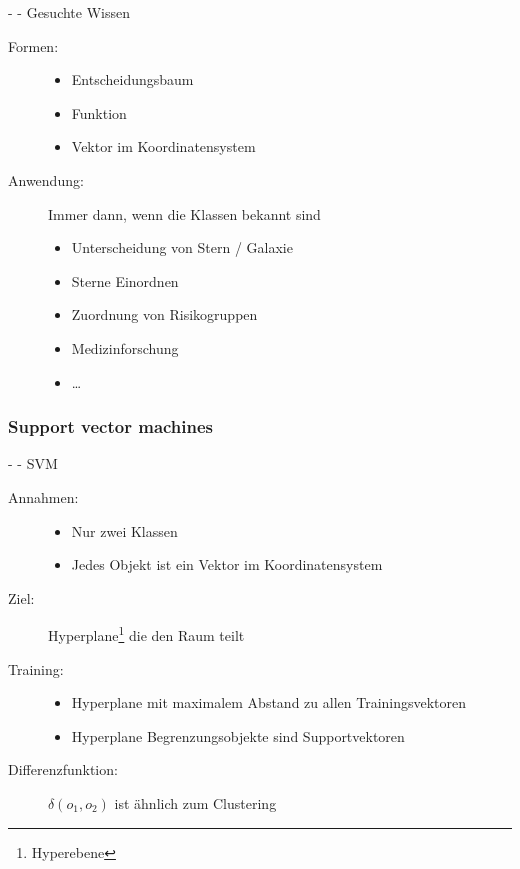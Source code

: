 \documentclass[fleqn,11pt,aspectratio=43]{beamer}
\begin{document}
\begin{frame}{\insertsectionhead - \insertsubsectionhead - Gesuchte Wissen \cite{ester2000knowledge}}
\begin{description}
\item[Formen:]
\begin{itemize}
\item Entscheidungsbaum %
\item Funktion %
\item Vektor im Koordinatensystem
\end{itemize}
\item[Anwendung:] Immer dann, wenn die Klassen bekannt sind
\begin{itemize}
\item Unterscheidung von Stern / Galaxie
\item Sterne Einordnen
\item Zuordnung von Risikogruppen
\item Medizinforschung
\item \dots
\end{itemize}
\end{description}
\end{frame}

\subsubsection{Support vector machines~}\label{svm}

\begin{frame}{\insertsectionhead - \insertsubsectionhead - SVM \cite{dwh}}
\begin{description}
\item[Annahmen:]
\begin{itemize}
\item Nur zwei Klassen
\item Jedes Objekt ist ein Vektor im Koordinatensystem
\end{itemize}
\item[Ziel:]  Hyperplane\footnote{Hyperebene} die den Raum teilt 
\item[Training:]
\begin{itemize}
\item Hyperplane mit maximalem Abstand zu allen Trainingsvektoren
\item Hyperplane Begrenzungsobjekte sind Supportvektoren
\end{itemize} 
\item[Differenzfunktion:] $\delta(o_1, o_2)$ ist ähnlich zum Clustering
\end{description}
\end{frame}
\end{document}
